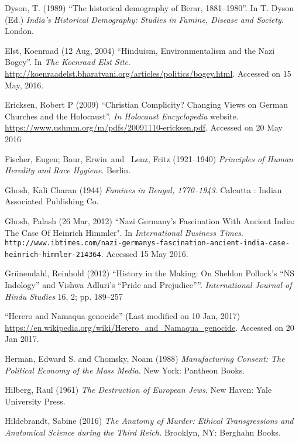 \begin{thebibliography}{99}
Dyson, T. (1989) “The historical demography of Berar, 1881–1980”. In T. Dyson (Ed.) {\sl India’s Historical Demography: Studies in Famine, Disease and Society}. London. 

Elst, Koenraad (12 Aug, 2004) “Hinduism, Environmentalism and the Nazi Bogey”. In {\sl The Koenraad Elst Site}. \url{http://koenraadelst.bharatvani.org/articles/politics/bogey.html}. Accessed on 15 May, 2016.

Ericksen, Robert P (2009) “Christian Complicity? Changing Views on German Churches and the Holocaust”. {\sl In Holocaust Encyclopedia} website. \url{https://www.ushmm.org/m/pdfs/20091110-ericksen.pdf}. Accessed on 20 May 2016

Fischer, Eugen;  Baur, Erwin and  Lenz, Fritz  (1921--1940) {\sl Principles of Human Heredity and Race Hygiene}. Berlin.

Ghosh, Kali Charan (1944) {\sl Famines in Bengal, 1770--1943}. Calcutta : Indian Associated Publishing Co.

Ghosh, Palash (26 Mar, 2012) “Nazi Germany’s Fascination With Ancient India: The Case Of Heinrich Himmler". In {\sl International Business Times}.\\ {\tt http://www.ibtimes.com/nazi-germanys-fascination-\break ancient-india-case-heinrich-himmler-214364}. Accessed 15 May 2016.

Grünendahl, Reinhold (2012) “History in the Making: On Sheldon Pollock’s “NS Indology” and Vishwa Adluri’s “Pride and Prejudice””. {\sl International Journal of Hindu Studies} 16, 2; pp. 189--257

“Herero and Namaqua genocide” (Last modified on 10 Jan, 2017) \url{https://en.wikipedia.org/wiki/Herero_and_Namaqua_genocide}. Accessed on 20 Jan 2017.

Herman, Edward S. and Chomsky, Noam (1988) {\sl Manufacturing Consent: The Political Economy of the Mass Media.} New York: Pantheon Books.

Hilberg, Raul (1961) {\sl The Destruction of European Jews.} New Haven: Yale University Press.

Hildebrandt, Sabine (2016) {\sl The Anatomy of Murder: Ethical Transgressions and Anatomical Science during the Third Reich.} Brooklyn, NY: Berghahn Books.


\end{thebibliography}
